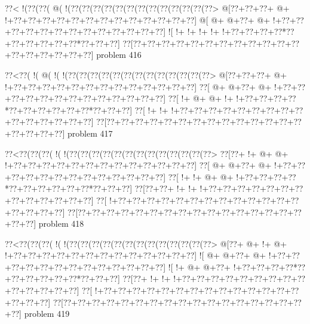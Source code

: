 \vbox{\vbox{\goo
\0??<\- !(\0??(\0??(\- @(\- !(\0??(\0??(\0??(\0??(\0??(\0??(\0??(\0??(\0??(\0??(\0??(\0??(\0??>
\- @[\0??+\0??+\0??+\- @+\- !+\0??+\0??+\0??+\0??+\0??+\0??+\0??+\0??+\0??+\0??+\0??+\0??+\0??]
\- @[\- @+\- @+\0??+\- @+\- !+\0??+\0??+\0??+\0??+\0??+\0??+\0??+\0??+\0??+\0??+\0??+\0??+\0??]
\- ![\- !+\- !+\- !+\- !+\- !+\0??+\0??+\0??+\0??*\0??+\0??+\0??+\0??+\0??+\0??*\0??+\0??+\0??]
\0??[\0??+\0??+\0??+\0??+\0??+\0??+\0??+\0??+\0??+\0??+\0??+\0??+\0??+\0??+\0??+\0??+\0??+\0??]
}
\hfil problem 416\hfil\break
}



\vbox{\vbox{\goo
\0??<\0??(\- !(\- @(\- !(\- !(\0??(\0??(\0??(\0??(\0??(\0??(\0??(\0??(\0??(\0??(\0??(\0??(\0??>
\- @[\0??+\0??+\0??+\- @+\- !+\0??+\0??+\0??+\0??+\0??+\0??+\0??+\0??+\0??+\0??+\0??+\0??+\0??]
\0??[\- @+\- @+\0??+\- @+\- !+\0??+\0??+\0??+\0??+\0??+\0??+\0??+\0??+\0??+\0??+\0??+\0??+\0??]
\0??[\- !+\- @+\- @+\- !+\- !+\0??+\0??+\0??+\0??*\0??+\0??+\0??+\0??+\0??+\0??*\0??+\0??+\0??]
\0??[\- !+\- !+\- !+\0??+\0??+\0??+\0??+\0??+\0??+\0??+\0??+\0??+\0??+\0??+\0??+\0??+\0??+\0??]
\0??[\0??+\0??+\0??+\0??+\0??+\0??+\0??+\0??+\0??+\0??+\0??+\0??+\0??+\0??+\0??+\0??+\0??+\0??]
}
\hfil problem 417\hfil\break
}



\vbox{\vbox{\goo
\0??<\0??(\0??(\0??(\- !(\- !(\0??(\0??(\0??(\0??(\0??(\0??(\0??(\0??(\0??(\0??(\0??(\0??(\0??>
\0??[\0??+\- !+\- @+\- @+\- !+\0??+\0??+\0??+\0??+\0??+\0??+\0??+\0??+\0??+\0??+\0??+\0??+\0??]
\0??[\- @+\- @+\0??+\- @+\- !+\0??+\0??+\0??+\0??+\0??+\0??+\0??+\0??+\0??+\0??+\0??+\0??+\0??]
\0??[\- !+\- !+\- @+\- @+\- !+\0??+\0??+\0??+\0??*\0??+\0??+\0??+\0??+\0??+\0??*\0??+\0??+\0??]
\0??[\0??+\0??+\- !+\- !+\- !+\0??+\0??+\0??+\0??+\0??+\0??+\0??+\0??+\0??+\0??+\0??+\0??+\0??]
\0??[\- !+\0??+\0??+\0??+\0??+\0??+\0??+\0??+\0??+\0??+\0??+\0??+\0??+\0??+\0??+\0??+\0??+\0??]
\0??[\0??+\0??+\0??+\0??+\0??+\0??+\0??+\0??+\0??+\0??+\0??+\0??+\0??+\0??+\0??+\0??+\0??+\0??]
}
\hfil problem 418\hfil\break
}



\vbox{\vbox{\goo
\0??<\0??(\0??(\0??(\- !(\- !(\0??(\0??(\0??(\0??(\0??(\0??(\0??(\0??(\0??(\0??(\0??(\0??(\0??>
\- @[\0??+\- @+\- !+\- @+\- !+\0??+\0??+\0??+\0??+\0??+\0??+\0??+\0??+\0??+\0??+\0??+\0??+\0??]
\- ![\- @+\- @+\0??+\- @+\- !+\0??+\0??+\0??+\0??+\0??+\0??+\0??+\0??+\0??+\0??+\0??+\0??+\0??]
\- ![\- !+\- @+\- @+\0??+\- !+\0??+\0??+\0??+\0??*\0??+\0??+\0??+\0??+\0??+\0??*\0??+\0??+\0??]
\0??[\0??+\- !+\- !+\- !+\0??+\0??+\0??+\0??+\0??+\0??+\0??+\0??+\0??+\0??+\0??+\0??+\0??+\0??]
\0??[\- !+\0??+\0??+\0??+\0??+\0??+\0??+\0??+\0??+\0??+\0??+\0??+\0??+\0??+\0??+\0??+\0??+\0??]
\0??[\0??+\0??+\0??+\0??+\0??+\0??+\0??+\0??+\0??+\0??+\0??+\0??+\0??+\0??+\0??+\0??+\0??+\0??]
}
\hfil problem 419\hfil\break
}



